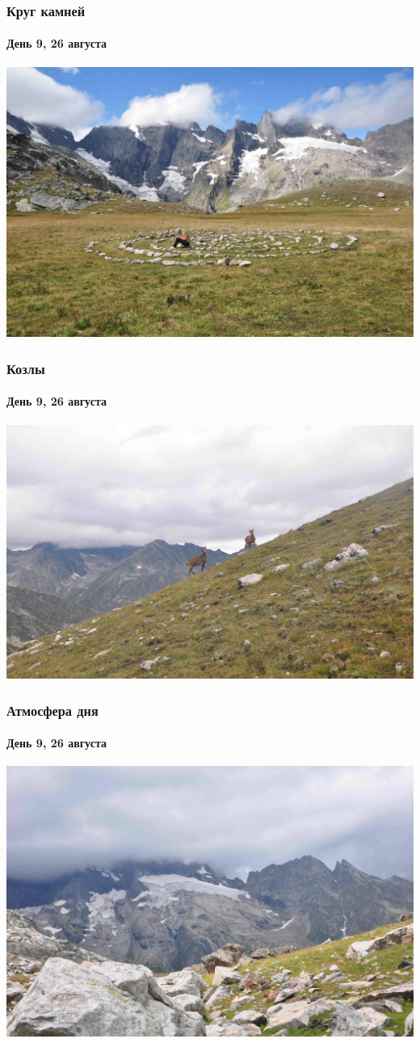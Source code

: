 \begin{frame}
	\frametitle{Круг камней}
	\framesubtitle{День 9, 26 августа}
	\centering
	\includegraphics[width=\textwidth]{../pics/DSC_0192}			
\end{frame}

\begin{frame}
	\frametitle{Козлы}
	\framesubtitle{День 9, 26 августа}
	\centering
	\includegraphics[width=\textwidth]{../pics/DSC_0211}			
\end{frame}

\begin{frame}
	\frametitle{Атмосфера дня}
	\framesubtitle{День 9, 26 августа}
	\centering
	\includegraphics[width=\textwidth]{../pics/DSC_0222}			
\end{frame}

